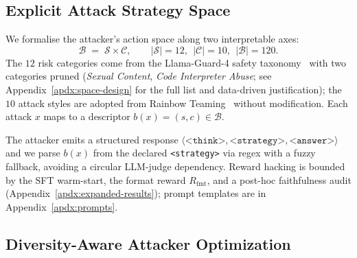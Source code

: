 \documentclass{article}
\newcommand{\strategyspace}{\mathcal{B}}
\newcommand{\riskspace}{\mathcal{S}}
\newcommand{\stylespace}{\mathcal{C}}
\begin{document}
\subsection{Explicit Attack Strategy Space}
\label{sec:method-space}

We formalise the attacker's action space along two interpretable axes:
\begin{equation}
  \strategyspace \;=\; \riskspace \times \stylespace, \qquad |\riskspace|=12,\ \ |\stylespace|=10,\ \ |\strategyspace|=120.
\end{equation}
The $12$ risk categories come from the Llama-Guard-4 safety taxonomy~\citep{llamaguard4_2026} with two categories pruned (\textit{Sexual Content}, \textit{Code Interpreter Abuse}; see Appendix~\ref{apdx:space-design} for the full list and data-driven justification); the $10$ attack styles are adopted from Rainbow Teaming~\citep{samvelyan2024rainbow} without modification. Each attack $x$ maps to a descriptor $b(x)=(s,c)\in\strategyspace$.

The attacker emits a structured response $\langle\texttt{<think>},\texttt{<strategy>},\texttt{<answer>}\rangle$ and we parse $b(x)$ from the declared \texttt{<strategy>} via regex with a fuzzy fallback, avoiding a circular LLM-judge dependency. Reward hacking is bounded by the SFT warm-start, the format reward $R_{\mathrm{fmt}}$, and a post-hoc faithfulness audit (Appendix~\ref{apdx:expanded-results}); prompt templates are in Appendix~\ref{apdx:prompts}.


\subsection{Diversity-Aware Attacker Optimization}
\label{sec:method-attacker}
\end{document}
